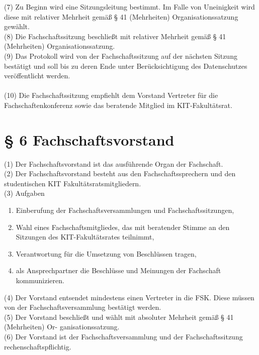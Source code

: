 \documentclass[a4paper, parskip=half, numbers=noenddot]{scrartcl}
\begin{document}
(7) Zu Beginn wird eine Sitzungsleitung bestimmt. Im Falle von Uneinigkeit wird diese mit relativer Mehrheit gemäß § 41 (Mehrheiten) Organisationssatzung gewählt.\\

(8) Die Fachschaftssitzung beschließt mit relativer Mehrheit gemäß § 41 (Mehrheiten) Organisationssatzung.\\

(9) Das Protokoll wird von der Fachschaftssitzung auf der nächsten Sitzung bestätigt und soll bis zu deren Ende unter Berücksichtigung des Datenschutzes veröffentlicht werden.\\\\

(10) Die Fachschaftssitzung empfiehlt dem Vorstand Vertreter für die Fachschaftenkonferenz sowie das beratende Mitglied im KIT-Fakultätsrat.



%
%

\section*{§ 6 Fachschaftsvorstand}

(1) Der Fachschaftsvorstand ist das ausführende Organ der Fachschaft.\\

(2) Der Fachschaftsvorstand besteht aus den Fachschaftssprechern und den studentischen KIT Fakultätsratsmitgliedern.\\

(3) Aufgaben

\begin{enumerate}
    \item  Einberufung der Fachschaftsversammlungen und Fachschaftssitzungen,
    \item Wahl eines Fachschaftsmitgliedes, das mit beratender Stimme an den Sitzungen des KIT-Fakultätsrates teilnimmt,
    \item Verantwortung für die Umsetzung von Beschlüssen tragen,
    \item als Ansprechpartner die Beschlüsse und Meinungen der Fachschaft kommunizieren.
\end{enumerate}

(4) Der Vorstand entsendet mindestens einen Vertreter in die FSK. Diese müssen von der
Fachschaftsversammlung bestätigt werden.\\
(5) Der Vorstand beschließt und wählt mit absoluter Mehrheit gemäß § 41 (Mehrheiten) Or-
ganisationssatzung.\\
(6) Der Vorstand ist der Fachschaftsversammlung und der Fachschaftssitzung rechenschaftspflichtig.
\end{document}
